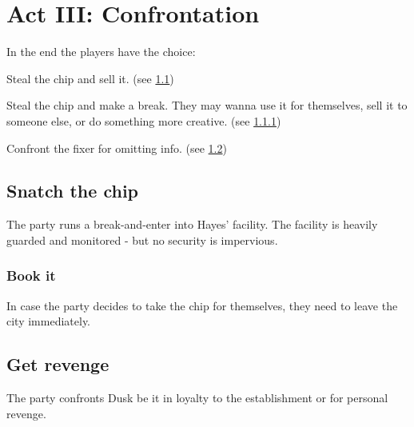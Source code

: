 \chapter{Act III: Confrontation}
\label{ch:act3}
In the end the players have the choice:
\begin{sitemize}
	\item Steal the chip and sell it.
		(see \ref{sec:steal})
	\item Steal the chip and make a break.
		They may wanna use it for themselves,
		sell it to someone else,
		or do something more creative.
		(see \ref{sec:flee})
	\item Confront the fixer for omitting info.
		(see \ref{sec:revenge})
\end{sitemize}

\section{Snatch the chip}
\label{sec:steal}
The party runs a break-and-enter into Hayes' facility.
The facility is heavily guarded and monitored
	- but no security is impervious.

\subsection{Book it}
\label{sec:flee}
In case the party decides to take the chip for themselves,
	they need to leave the city immediately.

\section{Get revenge}
\label{sec:revenge}
The party confronts Dusk 
	be it
	in loyalty to the establishment
	or for personal revenge.
